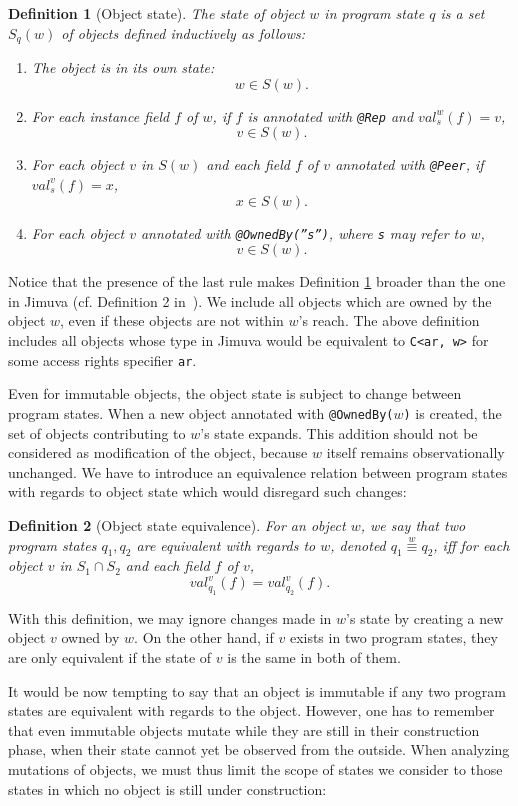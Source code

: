 \documentclass{pracamgr}
\theoremstyle{break}
\newtheorem{defi}{Definition}
\theoremstyle{break}
\theoremstyle{break}
\begin{document}
\begin{defi}[Object state]
  \label{def:state}
  The \emph{state} of object $w$ in program state $q$ is a set $S_q(w)$
  of objects defined inductively as follows:
  \begin{enumerate}[label=(\arabic*)]
  \item The object is in its own state: 
    $$w \in S(w).$$
  \item For each instance field $f$ of $w$, if $f$ is annotated with
    \texttt{@Rep} and $val_s^w(f) = v$,
    $$v \in S(w).$$
  \item For each object $v$ in $S(w)$ and each field $f$ of $v$
    annotated with \texttt{@Peer}, if $val_s^v(f) = x$, 
    $$ x \in S(w).$$
  \item For each object $v$ annotated with \texttt{@OwnedBy(''s'')},
    where \texttt{s} may refer to $w$,
    $$v \in S(w).$$
  \end{enumerate}
\end{defi}
Notice that the presence of the last rule makes Definition
\ref{def:state} broader than the one in Jimuva (cf. Definition 2
in~\cite{haack}). We include all objects which are owned by the
object $w$, even if these objects are not within $w$'s reach. The
above definition includes all objects whose type in Jimuva would be
equivalent to \texttt{C<ar, w>} for some access rights specifier
\texttt{ar}.

Even for immutable objects, the object state is subject to change
between program states. When a new object annotated with
\texttt{@OwnedBy($w$)} is created, the set of objects contributing
to $w$'s state expands. This addition should not be considered as
modification of the object, because $w$ itself remains observationally
unchanged. We have to introduce an equivalence relation between
program states with regards to object state which would disregard such
changes:
\begin{defi}[Object state equivalence]
  For an object $w$, we say that two program states $q_1, q_2$ are
  \emph{equivalent with regards to $w$}, denoted $q_1
  \stackrel{w}{\equiv} q_2$, iff for each object $v$ in $S_1 \cap S_2$ and
  each field $f$ of $v$,
  $$val_{q_1}^{v}(f) = val_{q_2}^{v}(f).$$
\end{defi}
With this definition, we may ignore changes made in $w$'s state by
creating a new object $v$ owned by $w$. On the other hand, if $v$
exists in two program states, they are only equivalent if the state of
$v$ is the same in both of them.

It would be now tempting to say that an object is immutable if any two
program states are equivalent with regards to the object. However, one
has to remember that even immutable objects mutate while they are
still in their construction phase, when their state cannot yet be
observed from the outside. When analyzing mutations of objects, we
must thus limit the scope of states we consider to those states in
which no object is still under construction:
\end{document}
